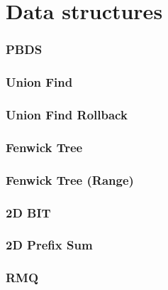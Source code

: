 \chapter{Data structures}

\subsection{PBDS}

\subsection{Union Find}

\subsection{Union Find Rollback}

\subsection{Fenwick Tree}

\subsection{Fenwick Tree (Range)}

\subsection{2D BIT}

\subsection{2D Prefix Sum}

\subsection{RMQ}

